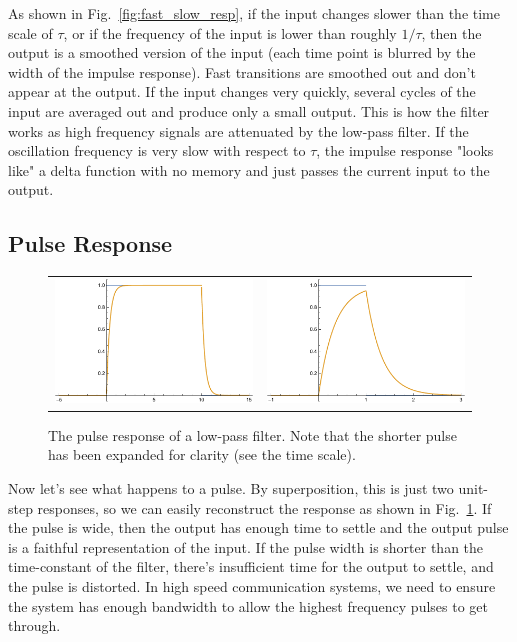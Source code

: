 As shown in Fig.~\ref{fig:fast_slow_resp}, if the input changes slower than the time scale of $\tau$, or if the frequency of the input is lower than roughly $1/\tau$, then the output is a smoothed version of the input (each time point is blurred by the width of the impulse response).  Fast transitions are smoothed out and don't appear at the output.   If the input changes very quickly, several cycles of the input are averaged out and produce only a small output.  This is how the filter works as high frequency signals are attenuated by the low-pass filter.  If the oscillation frequency is very slow with respect to $\tau$, the impulse response "looks like" a delta function with no memory and just passes the current input to the output.
 





\subsection{Pulse Response}


\begin{figure}[tb]
\begin{center}
\begin{tabular}{cc}
\includegraphics[width=.4\columnwidth]{long_pulse.pdf} &
\includegraphics[width=.4\columnwidth]{fast_pulse.pdf} \\
\end{tabular}
\end{center}
\caption{The pulse response of a low-pass filter.  Note that the shorter pulse has been expanded for clarity (see the time scale). } \label{fig:pulse_resp}
\end{figure}


Now let's see what happens to a pulse.  By superposition, this is just two unit-step responses, so we can easily reconstruct the response as shown in Fig.~\ref{fig:pulse_resp}.  If the pulse is wide, then the output has enough time to settle and the output pulse is a faithful representation of the input.  If the pulse width is shorter than the time-constant of the filter, there's insufficient time for the output to settle, and the pulse is distorted.  In high speed communication systems, we need to ensure the system has enough bandwidth to allow the highest frequency pulses to get through.  
 

